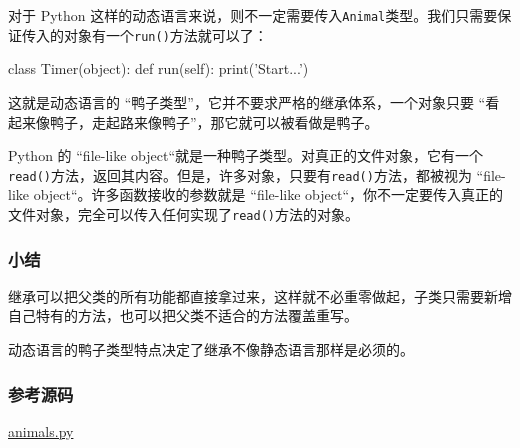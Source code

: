 对于 Python
这样的动态语言来说，则不一定需要传入\texttt{Animal}类型。我们只需要保证传入的对象有一个\texttt{run()}方法就可以了：

\begin{pythoncode}
class Timer(object):
    def run(self):
        print('Start...')
\end{pythoncode}

这就是动态语言的 ``鸭子类型''，它并不要求严格的继承体系，一个对象只要
``看起来像鸭子，走起路来像鸭子''，那它就可以被看做是鸭子。

Python 的 ``file-like
object``就是一种鸭子类型。对真正的文件对象，它有一个\texttt{read()}方法，返回其内容。但是，许多对象，只要有\texttt{read()}方法，都被视为
``file-like object``。许多函数接收的参数就是 ``file-like
object``，你不一定要传入真正的文件对象，完全可以传入任何实现了\texttt{read()}方法的对象。

\hypertarget{ux5c0fux7ed3}{%
\subsubsection{小结}\label{ux5c0fux7ed3}}

继承可以把父类的所有功能都直接拿过来，这样就不必重零做起，子类只需要新增自己特有的方法，也可以把父类不适合的方法覆盖重写。

动态语言的鸭子类型特点决定了继承不像静态语言那样是必须的。

\hypertarget{ux53c2ux8003ux6e90ux7801}{%
\subsubsection{参考源码}\label{ux53c2ux8003ux6e90ux7801}}

\href{https://github.com/michaelliao/learn-python3/blob/master/samples/oop_basic/animals.py}{animals.py}

